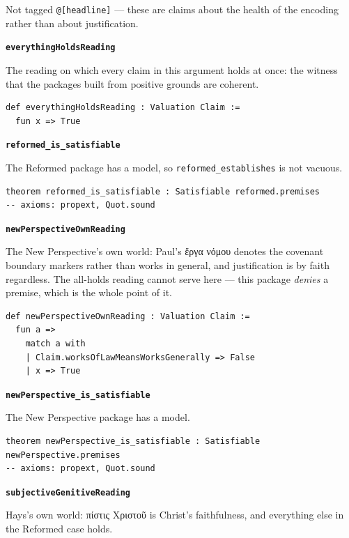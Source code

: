 \documentclass[11pt]{article}
\begin{document}
Not tagged \texttt{@[headline]} — these are claims about the health of the encoding rather than about justification.

\par\medskip\noindent\textbf{\texttt{everything\allowbreak{}Holds\allowbreak{}Reading}}\par\nobreak\noindent
The reading on which every claim in this argument holds at once: the witness that the packages built from positive grounds are coherent.

{\small\begin{verbatim}
def everythingHoldsReading : Valuation Claim :=
  fun x => True
\end{verbatim}}
\par\medskip\noindent\textbf{\texttt{reformed\_\allowbreak{}is\_\allowbreak{}satisfiable}}\par\nobreak\noindent
The Reformed package has a model, so \texttt{reformed\_\allowbreak{}establishes} is not vacuous.

{\small\begin{verbatim}
theorem reformed_is_satisfiable : Satisfiable reformed.premises
-- axioms: propext, Quot.sound
\end{verbatim}}
\par\medskip\noindent\textbf{\texttt{new\allowbreak{}Perspective\allowbreak{}Own\allowbreak{}Reading}}\par\nobreak\noindent
The New Perspective's own world: Paul's ἔργα νόμου denotes the covenant boundary markers rather than works in general, and justification is by faith regardless. The all-holds reading cannot serve here — this package \emph{denies} a premise, which is the whole point of it.

{\small\begin{verbatim}
def newPerspectiveOwnReading : Valuation Claim :=
  fun a =>
    match a with
    | Claim.worksOfLawMeansWorksGenerally => False
    | x => True
\end{verbatim}}
\par\medskip\noindent\textbf{\texttt{new\allowbreak{}Perspective\_\allowbreak{}is\_\allowbreak{}satisfiable}}\par\nobreak\noindent
The New Perspective package has a model.

{\small\begin{verbatim}
theorem newPerspective_is_satisfiable : Satisfiable newPerspective.premises
-- axioms: propext, Quot.sound
\end{verbatim}}
\par\medskip\noindent\textbf{\texttt{subjective\allowbreak{}Genitive\allowbreak{}Reading}}\par\nobreak\noindent
Hays's own world: πίστις Χριστοῦ is Christ's faithfulness, and everything else in the Reformed case holds.
\end{document}
